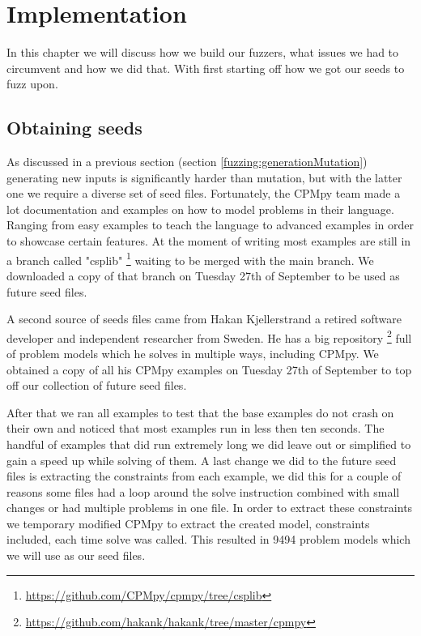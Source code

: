 \chapter{Implementation}
\label{cha:impl}
\label{impl:Intro}
In this chapter we will discuss how we build our fuzzers, what issues we had to circumvent and how we did that. With first starting off how we got our seeds to fuzz upon.

\section{Obtaining seeds}
\label{impl:obtainingSeeds}
As discussed in a previous section (section \ref{fuzzing:generationMutation}) generating new inputs is significantly harder than mutation, but with the latter one we require a diverse set of seed files. Fortunately, the CPMpy team made a lot documentation and examples on how to model problems in their language. Ranging from easy examples to teach the language to advanced examples in order to showcase certain features. At the moment of writing most examples are still in a branch called "csplib" \footnote{\url{https://github.com/CPMpy/cpmpy/tree/csplib}} waiting to be merged with the main branch. We downloaded a copy of that branch on Tuesday 27th of September to be used as future seed files. 

A second source of seeds files came from Hakan Kjellerstrand a retired software developer and independent researcher from Sweden. He has a big repository \footnote{\url{https://github.com/hakank/hakank/tree/master/cpmpy}} full of problem models which he solves in multiple ways, including CPMpy. We obtained a copy of all his CPMpy examples on Tuesday 27th of September to top off our collection of future seed files.

After that we ran all examples to test that the base examples do not crash on their own and noticed that most examples run in less then ten seconds. The handful of examples that did run extremely long we did leave out or simplified to gain a speed up while solving of them. A last change we did to the future seed files is extracting the constraints from each example, we did this for a couple of reasons some files had a loop around the solve instruction combined with small changes or had multiple problems in one file. In order to extract these constraints we temporary modified CPMpy to extract the created model, constraints included, each time solve was called. This resulted in 9494 problem models which we will use as our seed files.

